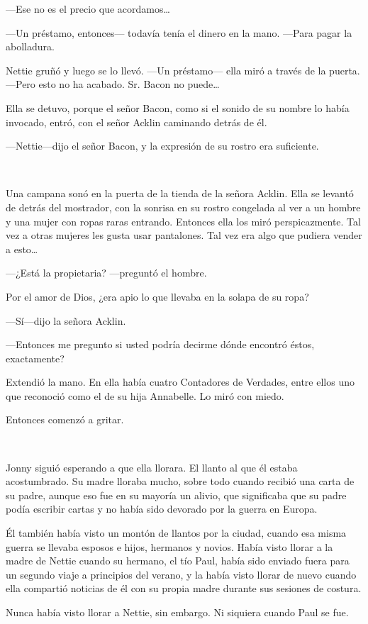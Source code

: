 ---Ese no es el precio que acordamos\ldots{}

---Un préstamo, entonces--- todavía tenía el dinero en la mano. ---Para
pagar la abolladura.

Nettie gruñó y luego se lo llevó. ---Un préstamo--- ella miró a través
de la puerta. ---Pero esto no ha acabado. Sr. Bacon no puede\ldots{}

Ella se detuvo, porque el señor Bacon, como si el sonido de su nombre lo
había invocado, entró, con el señor Acklin caminando detrás de él.

---Nettie---dijo el señor Bacon, y la expresión de su rostro era
suficiente.

~

Una campana sonó en la puerta de la tienda de la señora Acklin. Ella se
levantó de detrás del mostrador, con la sonrisa en su rostro congelada
al ver a un hombre y una mujer con ropas raras entrando. Entonces ella
los miró perspicazmente. Tal vez a otras mujeres les gusta usar
pantalones. Tal vez era algo que pudiera vender a esto\ldots{}

---¿Está la propietaria? ---preguntó el hombre.

Por el amor de Dios, ¿era apio lo que llevaba en la solapa de su ropa?

---Sí---dijo la señora Acklin.

---Entonces me pregunto si usted podría decirme dónde encontró éstos,
exactamente?

Extendió la mano. En ella había cuatro Contadores de Verdades, entre
ellos uno que reconoció como el de su hija Annabelle. Lo miró con miedo.

Entonces comenzó a gritar.

~

Jonny siguió esperando a que ella llorara. El llanto al que él estaba
acostumbrado. Su madre lloraba mucho, sobre todo cuando recibió una
carta de su padre, aunque eso fue en su mayoría un alivio, que
significaba que su padre podía escribir cartas y no había sido devorado
por la guerra en Europa.

Él también había visto un montón de llantos por la ciudad, cuando esa
misma guerra se llevaba esposos e hijos, hermanos y novios. Había visto
llorar a la madre de Nettie cuando su hermano, el tío Paul, había sido
enviado fuera para un segundo viaje a principios del verano, y la había
visto llorar de nuevo cuando ella compartió noticias de él con su propia
madre durante sus sesiones de costura.

Nunca había visto llorar a Nettie, sin embargo. Ni siquiera cuando Paul
se fue.

